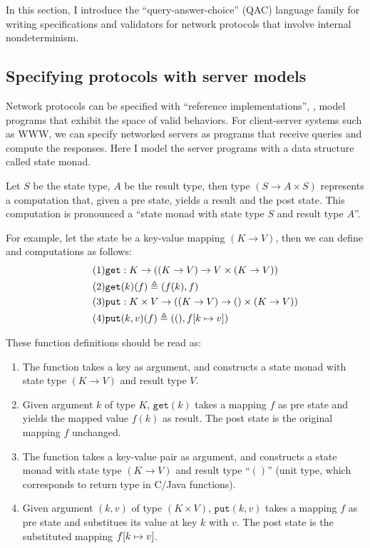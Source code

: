 In this section, I introduce the ``query-answer-choice'' (QAC) language family
for writing specifications and validators for network protocols that involve
internal nondeterminism.

\subsection{Specifying protocols with server models}
\label{sec:qac-model}
Network protocols can be specified with ``reference implementations'', \ie,
model programs that exhibit the space of valid behaviors.  For client-server
systems such as WWW, we can specify networked servers as programs that receive
queries and compute the responses.  Here I model the server programs with a data
structure called state monad.

\begin{definition}
  Let $S$ be the state type, $A$ be the result type, then type $(S\to A\times
  S)$ represents a computation that, given a pre state, yields a result and the
  post state.  This computation is pronounced a ``state monad with state type
  $S$ and result type $A$''.

  For example, let the state be a key-value mapping $(K\to V)$, then we can
  define  and  computations as follows:
  \begin{align}
    \tag{1}&\mathtt{get}:K\to((K\to V)\to V\times(K\to V))\\
    \tag{2}&\mathtt{get}(k)(f)\triangleq (f(k), f)\\
    \tag{3}&\mathtt{put}:K\times V\to((K\to V)\to ()\times(K\to V))\\
    \tag{4}&\mathtt{put}(k,v)(f)\triangleq((),f[k\mapsto v])
  \end{align}

  These function definitions should be read as:
  \begin{enumerate}
    \item The  function takes a key as argument, and constructs a
      state monad with state type $(K\to V)$ and result type $V$.
    \item Given argument $k$ of type $K$, $\mathtt{get}(k)$ takes a mapping $f$
      as pre state and yields the mapped value $f(k)$ as result.  The post state
      is the original mapping $f$ unchanged.
    \item The  function takes a key-value pair as argument, and
      constructs a state monad with state type $(K\to V)$ and result type
      ``$()$'' (unit type, which corresponds to  return type in
      C/Java functions).
    \item Given argument $(k,v)$ of type $(K\times V)$, $\mathtt{put}(k,v)$
      takes a mapping $f$ as pre state and substitues its value at key $k$ with
      $v$.  The post state is the substituted mapping $f[k\mapsto v]$.
  \end{enumerate}
\end{definition}

